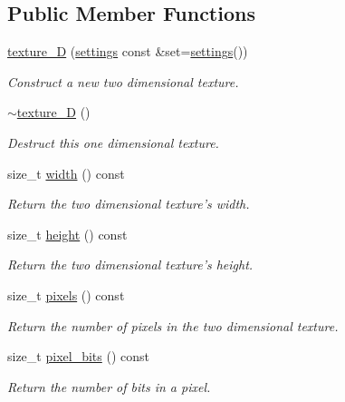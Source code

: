 \subsection*{Public Member Functions}
\begin{DoxyCompactItemize}
\item 
\hyperlink{classgfx_1_1texture__2D_a470e8c3a2ebf5335e2a2817b2fbb9f1b}{texture\-\_\-D} (\hyperlink{classgfx_1_1texture__2D_1_1settings}{settings} const \&set=\hyperlink{classgfx_1_1texture__2D_1_1settings}{settings}())
\begin{DoxyCompactList}\small\item\em Construct a new two dimensional texture. \end{DoxyCompactList}\item 
\hyperlink{classgfx_1_1texture__2D_a276827f3418a15f5d8e9cc858f770dd5}{$\sim$texture\-\_\-D} ()
\begin{DoxyCompactList}\small\item\em Destruct this one dimensional texture. \end{DoxyCompactList}\item 
size\-\_\-t \hyperlink{classgfx_1_1texture__2D_a2255243222f090924127e1357c2c2fca}{width} () const 
\begin{DoxyCompactList}\small\item\em Return the two dimensional texture's width. \end{DoxyCompactList}\item 
size\-\_\-t \hyperlink{classgfx_1_1texture__2D_afd47185061e56de07b5e9be5d9ef2f36}{height} () const 
\begin{DoxyCompactList}\small\item\em Return the two dimensional texture's height. \end{DoxyCompactList}\item 
size\-\_\-t \hyperlink{classgfx_1_1texture__2D_aaaa730b58b577b595d2bf09825084229}{pixels} () const 
\begin{DoxyCompactList}\small\item\em Return the number of pixels in the two dimensional texture. \end{DoxyCompactList}\item 
size\-\_\-t \hyperlink{classgfx_1_1texture__2D_ab1ae77589e20d00edef9ba2d4899124f}{pixel\-\_\-bits} () const 
\begin{DoxyCompactList}\small\item\em Return the number of bits in a pixel. \end{DoxyCompactList}\item 

\end{DoxyCompactItemize}
